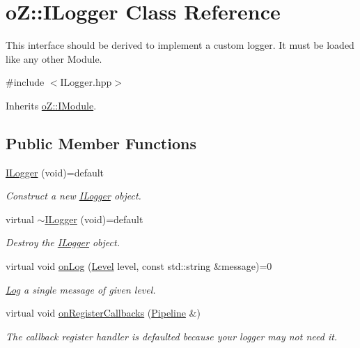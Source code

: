 \hypertarget{classo_z_1_1_i_logger}{}\section{oZ\+::I\+Logger Class Reference}
\label{classo_z_1_1_i_logger}


This interface should be derived to implement a custom logger. It must be loaded like any other Module.  




{\ttfamily \#include $<$I\+Logger.\+hpp$>$}



Inherits \mbox{\hyperlink{classo_z_1_1_i_module}{o\+Z\+::\+I\+Module}}.

\subsection*{Public Member Functions}
\begin{DoxyCompactItemize}
\item 
\mbox{\hyperlink{classo_z_1_1_i_logger_a1ef3d8ab6931286af8f13e161520544b}{I\+Logger}} (void)=default
\begin{DoxyCompactList}\small\item\em Construct a new \mbox{\hyperlink{classo_z_1_1_i_logger}{I\+Logger}} object. \end{DoxyCompactList}\item 
virtual \mbox{\hyperlink{classo_z_1_1_i_logger_a5a6f9c60dcd37b014a3621ed39ef6ba6}{$\sim$\+I\+Logger}} (void)=default
\begin{DoxyCompactList}\small\item\em Destroy the \mbox{\hyperlink{classo_z_1_1_i_logger}{I\+Logger}} object. \end{DoxyCompactList}\item 
virtual void \mbox{\hyperlink{classo_z_1_1_i_logger_a2e0e168c9218055e41bdd5b57177cba1}{on\+Log}} (\mbox{\hyperlink{namespaceo_z_a72fc7662d5f07391ac6f0a5699014bfa}{Level}} level, const std\+::string \&message)=0
\begin{DoxyCompactList}\small\item\em \mbox{\hyperlink{classo_z_1_1_log}{Log}} a single message of given level. \end{DoxyCompactList}\item 
virtual void \mbox{\hyperlink{classo_z_1_1_i_logger_a10732b6da6e8f085c6fe5fa154d361ef}{on\+Register\+Callbacks}} (\mbox{\hyperlink{classo_z_1_1_pipeline}{Pipeline}} \&)
\begin{DoxyCompactList}\small\item\em The callback register handler is defaulted because your logger may not need it. \end{DoxyCompactList}\end{DoxyCompactItemize}
